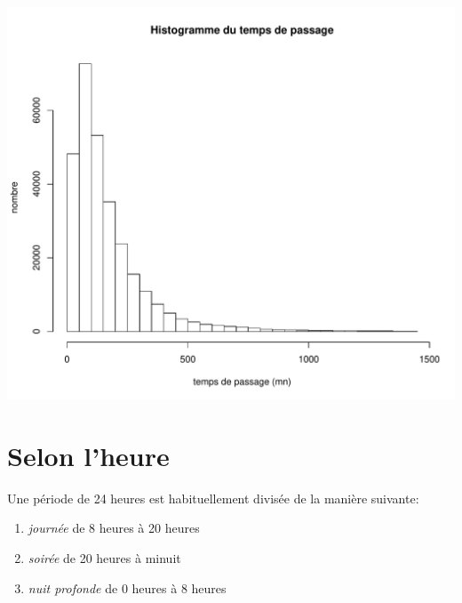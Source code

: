 \documentclass[12pt,english,french,twoside]{book}\usepackage[]{graphicx}\usepackage[]{color}
\makeatletter
\def\maxwidth{ %
  \ifdim\Gin@nat@width>\linewidth
    \linewidth
  \else
    \Gin@nat@width
  \fi
}
\newenvironment{knitrout}{}{} %
\makeatother
\begin{document}
 \begin{center}
\begin{knitrout}
\color{fgcolor}
\includegraphics[width=\maxwidth]{figure/hist_tous_passages} 

\end{knitrout}

 \label{fig:hist_passages}
\end{center}


\section{Selon l'heure}

Une période de 24 heures est habituellement divisée de la manière suivante:
\begin{enumerate}
  \item \emph{journée} de 8 heures à 20 heures
  \item \emph{soirée} de 20 heures à minuit
  \item  \emph{nuit profonde} de 0 heures à 8 heures
\end{enumerate}
\end{document}
